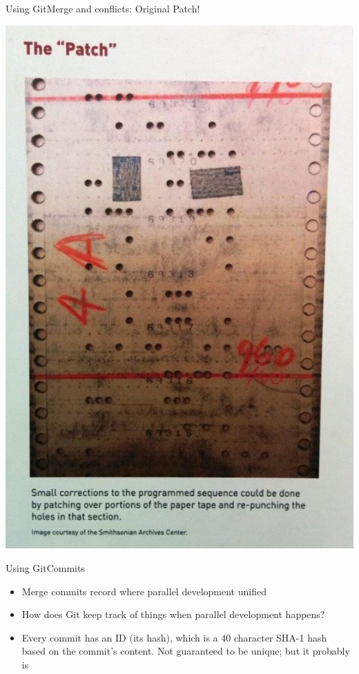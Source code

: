 \documentclass[10pt,compress]{beamer} %
\begin{document}
\begin{frame}{Using Git}{Merge and conflicts: Original Patch!}

\centering
\includegraphics[width=.4\textwidth,height=\textheight,keepaspectratio]{figs/patch.png}

\end{frame}


\begin{frame}{Using Git}{Commits}

\begin{itemize}
 \item Merge commits record where parallel development unified
 \item How does Git keep track of things when parallel development
happens?
\item Every commit has an ID (its hash), which is a 40 character SHA-1
hash based on the commit's content. Not guaranteed to be
unique; but it probably is
\end{itemize}

\end{frame}

\end{document}
